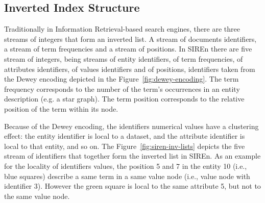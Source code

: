 \begin{table}
\centering
{}
\caption{Two different indexing strategies for semantic data, e.g. RDF triples.
The characters ``s'', ``p'' and ``o'' refer respectively to the subject,
predicate and object in a triple.}
\end{table}

\subsection{Inverted Index Structure}
\label{sec:siren-inv-lists}

Traditionally in Information Retrieval-based search engines, there are three
streams of integers that form an inverted list. A stream of documents
identifiers, a stream of term frequencies and a stream of positions.
In SIREn there are five stream of integers, being streams of entity
identifiers, of term frequencies, of attributes identifiers, of values
identifiers and of positions, identifiers taken from the Dewey encoding
depicted in the Figure~\ref{fig:dewey-encoding}. The term frequency corresponds
to the number of the term's occurrences in an entity description (e.g. a star
graph). The term position corresponds to the relative position of the term
within its node.

Because of the Dewey encoding, the identifiers numerical values have a
clustering effect: the entity identifier is local to a dataset, and the
attribute identifier is local to that entity, and so on. The
Figure~\ref{fig:siren-inv-lists} depicts the five stream of identifiers that
together form the inverted list in SIREn.
As an example for the locality of identifiers values, the position 5 and 7 in
the entity 10 (i.e., blue squares) describe a same term in a same value node
(i.e., value node with identifier 3). However the green square is local to the
same attribute 5, but not to the same value node.

